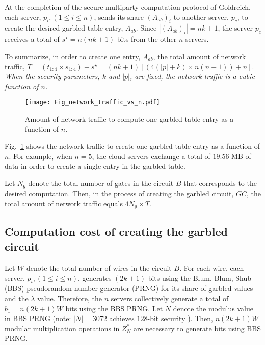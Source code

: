 \documentclass[10pt,journal,cspaper,compsoc]{IEEEtran}
\begin{document}
At the completion of the secure multiparty computation protocol of Goldreich, each server, $p_i, (1\le i\le n)$, sends its share $(A_{ab})_i$ to another server, $p_c$, to create the desired garbled table entry, $A_{ab}$. Since $|(A_{ab})_i|=nk+1$, the server $p_c$ receives a total of $s^{\star}=n(nk+1)$ bits from the other $n$ servers.


To summarize, in order to create one entry, $A_{ab}$, the total amount of network traffic, $T=(t_{1:4}\times s_{1:4})+s^{\star}=(nk+1)[(4(|p|+k)\times n(n-1))+n]$. {\em When the security parameters, $k$ and $|p|$, are fixed, the network traffic is a cubic function of $n$.}

\begin{figure}[t]
\centering
\texttt{[image: Fig\_network\_traffic\_vs\_n.pdf]}
\vspace{-3 mm}
\caption{Amount of network traffic to compute one garbled table entry as a function of $n$.\vspace{-4 mm}}
\label{fig_network_traffic}
\end{figure}

Fig.~\ref{fig_network_traffic} shows the network traffic to create one garbled table entry as a function of $n$. For example, when $n=5$, the cloud servers exchange a total of $19.56$ MB of data in order to create a single entry in the garbled table.


Let $N_g$ denote the total number of gates in the circuit $B$ that corresponds to the desired computation. Then, in the process of creating the garbled circuit, $GC$, the total amount of network traffic equals $4N_g\times T$.


\subsection{Computation cost of creating the garbled circuit}

Let $W$ denote the total number of wires in the circuit $B$. For each wire, each server, $p_i, (1\le i\le n)$, generates $(2k+1)$ bits using the Blum, Blum, Shub (BBS) pseudorandom number generator (PRNG) for its share of garbled values and the $\lambda$ value. Therefore, the $n$ servers collectively generate a total of $b_{1}=n(2k+1)W$ bits using the BBS PRNG. Let $N$ denote the modulus value in BBS PRNG (note: $|N|=3072$ achieves $128$-bit security \cite{nist_key_len_recommendations2012}). Then, $n(2k+1)W$ modular multiplication operations in $Z_N^*$ are necessary to generate bits using BBS PRNG.
\end{document}

